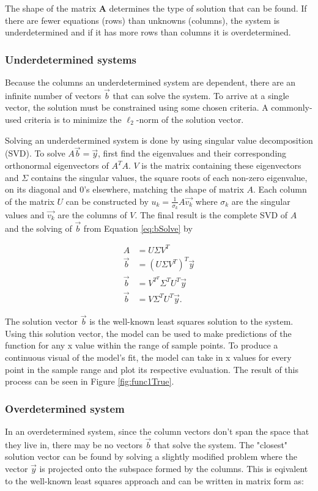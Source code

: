 The shape of the matrix $\mathbf{A}$ determines the type of solution that can be found.  If there are fewer equations (rows) than unknowns (columns), the system is underdetermined and if it has more rows than columns it is overdetermined.  
\subsubsection{Underdetermined systems}
Because the columns an underdetermined system are dependent, there are an infinite number of vectors $\vec{b}$ that can solve the system.  To arrive at a single vector, the solution must be constrained using some chosen criteria.  A commonly-used criteria is to minimize the $\ell_2$-norm of the solution vector. 

\par Solving an underdetermined system is done by using singular value decomposition (SVD)\cite{linAlg-book}. To solve $A\vec{b}=\vec{y}$, first find the eigenvalues and their corresponding orthonormal eigenvectors of $A^TA$. $V$ is the matrix containing these eigenvectors and $\Sigma$ contains the singular values, the square roots of each non-zero eigenvalue, on its diagonal and $0$'s elsewhere, matching the shape of matrix $A$. Each column of the matrix $U$ can be constructed by $u_k=\frac{1}{\sigma_k}A\vec{v_k}$ where $\sigma_k$ are the singular values and $\vec{v_k}$ are the columns of $V$. The final result is the complete SVD of $A$ and the solving of $\vec{b}$ from Equation \ref{eq:bSolve} by

\begin{align}
A & =U\Sigma V^T \\
\vec{b} &= (U\Sigma V^T)^T\vec{y} \\
\vec{b} &= V^{T^T}\Sigma^TU^T\vec{y} \\
\vec{b} &= V\Sigma^TU^T\vec{y}.
\end{align}

The solution vector $\vec{b}$ is the well-known least squares solution to the system. Using this solution vector, the model can be used to make predictions of the function for any x value within the range of sample points. To produce a continuous visual of the model's fit, the model can take in x values for every point in the sample range and plot its respective evaluation. The result of this process can be seen in Figure \ref{fig:func1True}.

\subsubsection{Overdetermined system}
In an overdetermined system, since the column vectors don't span the space that they live in, there may be no vectors $\vec{b}$ that solve the system.  The "closest" solution vector can be found by solving a slightly modified problem where the vector $\vec{y}$ is projected onto the subspace formed by the columns.  This is eqivalent to the well-known least squares approach and can be written in matrix form as:

